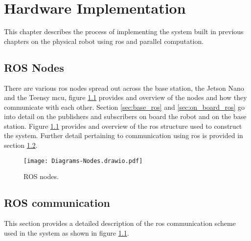 \chapter{Hardware Implementation} \label{chap:hardware}
This chapter describes the process of implementing the system built in previous chapters on the physical robot using \ac{ros} and parallel computation.

\section{ROS Nodes}
There are various ros nodes spread out across the base station, the Jetson Nano and the Teensy \ac{mcu}, figure \ref{fig:nodes} provides and overview
of the nodes and how they communicate with each other. Section \ref{sec:base_ros} and \ref{sec:on_board_ros} go into detail on the publishers and subscribers
on board the robot and on the base station. Figure \ref{fig:nodes} provides and overview of the \ac{ros} structure used to construct the system.
Further detail pertaining to communication using \ac{ros} is provided in section \ref{sec:ros_comms}.

\begin{figure}[h]
    \centering
    \texttt{[image: Diagrams-Nodes.drawio.pdf]}
    \caption{ROS nodes.}
    \label{fig:nodes}
\end{figure}

\newpage
\section{ROS communication} \label{sec:ros_comms}
    This section provides a detailed description of the \ac{ros} communication scheme used in the system as shown in figure \ref{fig:nodes}.
